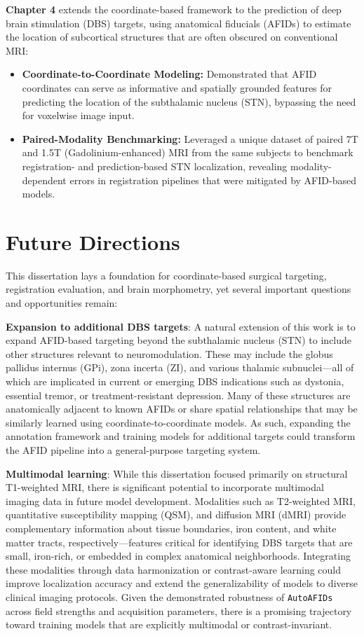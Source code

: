 \textbf{Chapter 4} extends the coordinate-based framework to the prediction of deep brain stimulation (DBS) targets, using anatomical fiducials (AFIDs) to estimate the location of subcortical structures that are often obscured on conventional MRI:
\begin{itemize}
    \item \textbf{Coordinate-to-Coordinate Modeling:} Demonstrated that AFID coordinates can serve as informative and spatially grounded features for predicting the location of the subthalamic nucleus (STN), bypassing the need for voxelwise image input.
    \item \textbf{Paired-Modality Benchmarking:} Leveraged a unique dataset of paired 7T and 1.5T (Gadolinium-enhanced) MRI from the same subjects to benchmark registration- and prediction-based STN localization, revealing modality-dependent errors in registration pipelines that were mitigated by AFID-based models.
\end{itemize}



\section{Future Directions}

This dissertation lays a foundation for coordinate-based surgical targeting, registration evaluation, and brain morphometry, yet several important questions and opportunities remain: 

\textbf{Expansion to additional DBS targets}: A natural extension of this work is to expand AFID-based targeting beyond the subthalamic nucleus (STN) to include other structures relevant to neuromodulation. These may include the globus pallidus internus (GPi), zona incerta (ZI), and various thalamic subnuclei—all of which are implicated in current or emerging DBS indications such as dystonia, essential tremor, or treatment-resistant depression. Many of these structures are anatomically adjacent to known AFIDs or share spatial relationships that may be similarly learned using coordinate-to-coordinate models. As such, expanding the annotation framework and training models for additional targets could transform the AFID pipeline into a general-purpose targeting system.

\textbf{Multimodal learning}: While this dissertation focused primarily on structural T1-weighted MRI, there is significant potential to incorporate multimodal imaging data in future model development. Modalities such as T2-weighted MRI, quantitative susceptibility mapping (QSM), and diffusion MRI (dMRI) provide complementary information about tissue boundaries, iron content, and white matter tracts, respectively—features critical for identifying DBS targets that are small, iron-rich, or embedded in complex anatomical neighborhoods. Integrating these modalities through data harmonization or contrast-aware learning could improve localization accuracy and extend the generalizability of models to diverse clinical imaging protocols. Given the demonstrated robustness of \texttt{AutoAFIDs} across field strengths and acquisition parameters, there is a promising trajectory toward training models that are explicitly multimodal or contrast-invariant.

